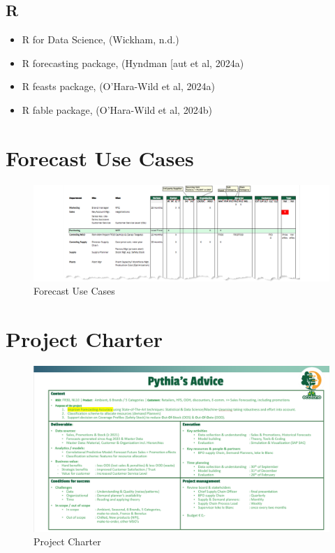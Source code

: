 \documentclass[
  american,
  10,
  a4paper,
]{book}
\providecommand{\tightlist}{%
  \setlength{\itemsep}{0pt}\setlength{\parskip}{0pt}}
\theoremstyle{definition}
\theoremstyle{remark}
\begin{document}
\subsection{R}\label{r}

\begin{itemize}
\tightlist
\item
  R for Data Science, (Wickham, n.d.)
\item
  R forecasting package, (Hyndman {[}aut et al, 2024a)
\item
  R feasts package, (O'Hara-Wild et al, 2024a)
\item
  R fable package, (O'Hara-Wild et al, 2024b)
\end{itemize}

\begin{landscape}

\section{Forecast Use Cases}\label{sec-forecast-use-cases}

\begin{figure}[H]

\caption{Forecast Use Cases}

{\centering \includegraphics[width=1\linewidth,height=\textheight,keepaspectratio]{nb/../images/forecast_use_cases.png}

}

\end{figure}%

\section{Project Charter}\label{sec-project-charter}

\begin{figure}[H]

\caption{Project Charter}

{\centering \includegraphics[width=1\linewidth,height=\textheight,keepaspectratio]{nb/../images/project_charter.png}

}
\end{figure}
\end{landscape}
\end{document}
